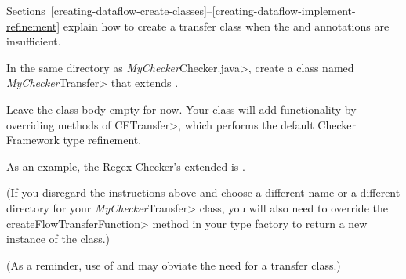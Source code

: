 Sections~\ref{creating-dataflow-create-classes}--\ref{creating-dataflow-implement-refinement}
explain how to create a transfer class when the
 and
 annotations are insufficient.



In the same directory as \<\emph{MyChecker}Checker.java>, create a class
named \<\emph{MyChecker}Transfer> that extends
.

Leave the class body empty for now.  Your class will add functionality by
overriding methods of \<CFTransfer>, which performs the default Checker
Framework type refinement.

As an example, the Regex Checker's extended
 is
.

(If you disregard the instructions above and choose a different name or a
different directory for your \<\emph{MyChecker}Transfer> class, you will
also need to override the \<createFlowTransferFunction> method in your type
factory to return a new instance of the class.)

(As a reminder, use of  and
 may obviate the need for
a transfer class.)

%

